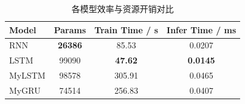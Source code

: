 \begin{table}[htbp]
\centering
\caption{各模型效率与资源开销对比}
\begin{tabular}{lccc}
\toprule
Model & Params & Train Time / s & Infer Time / ms \\
\midrule
RNN & \textbf{26386} & 85.53 & 0.0207 \\
LSTM & 99090 & \textbf{47.62} & \textbf{0.0145} \\
MyLSTM & 98578 & 305.91 & 0.0465 \\
MyGRU & 74514 & 256.83 & 0.0407\\
\bottomrule
\end{tabular}
\label{tab:efficiency_summary}
\end{table}
